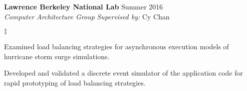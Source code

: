 \documentclass[margin,line]{res}
\newenvironment{list2}{
  \begin{list}{$\ddagger$}{%
      \setlength{\itemsep}{0in}
      \setlength{\parsep}{0in} \setlength{\parskip}{0in}
      \setlength{\topsep}{0in} \setlength{\partopsep}{0in}
      \setlength{\leftmargin}{0.2in}}}{\end{list}}
\begin{document}
\begin{resume}
\textbf{Lawrence Berkeley National Lab} \hfill Summer 2016\\
\textit{Computer Architecture Group} \hfill {\it Supervised by:} Cy Chan\\
\vspace{-0.1in}
\begin{list2}
\item Examined load balancing strategies for asynchronous execution models of hurricane storm surge simulations.
\item Developed and validated a discrete event simulator of the application code for rapid prototyping of load balancing strategies.
\end{list2}





\end{resume}
\end{document}
